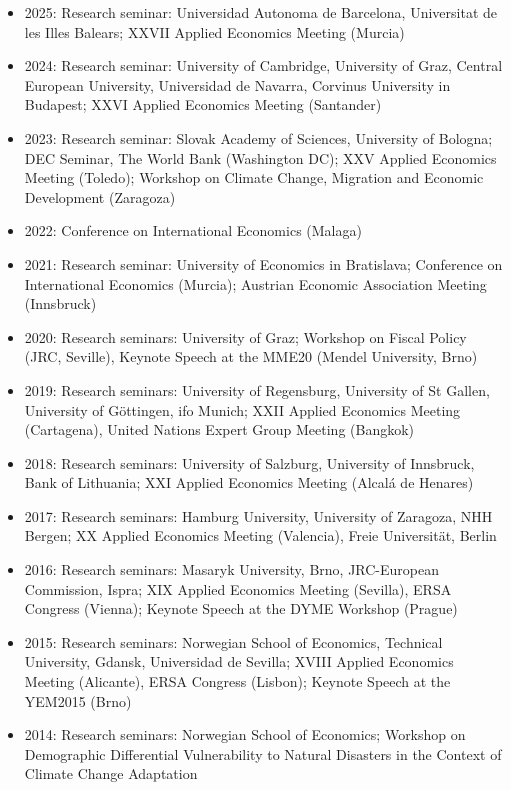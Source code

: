 \documentclass[10pt]{res} %
\begin{document}
\begin{resume}
\begin{itemize}
\item 2025: Research seminar: Universidad Autonoma de Barcelona, Universitat de les Illes Balears; XXVII Applied Economics Meeting (Murcia)
	\item 2024: Research seminar: University of Cambridge, University of Graz, Central European University, Universidad de Navarra, Corvinus University in Budapest; XXVI Applied Economics Meeting (Santander)
	\item 2023: Research seminar: Slovak Academy of Sciences, University of Bologna; DEC Seminar, The World Bank (Washington DC); XXV Applied Economics Meeting (Toledo); Workshop on Climate Change, Migration and Economic Development (Zaragoza)
	\item 2022: Conference on International Economics (Malaga)
	\item 2021: Research seminar: University of Economics in Bratislava; Conference on International Economics (Murcia); Austrian Economic Association Meeting (Innsbruck)
\item 2020: Research seminars: University of Graz; Workshop on Fiscal Policy (JRC, Seville), Keynote Speech at the MME20 (Mendel University, Brno)
\item 2019: Research seminars: University of Regensburg, University of St Gallen,  University of G\"ottingen, ifo Munich;  XXII Applied Economics Meeting (Cartagena), United Nations Expert Group Meeting (Bangkok)
\item 2018: Research seminars:  University of Salzburg,  University of Innsbruck, Bank of Lithuania; XXI Applied Economics Meeting (Alcal\'a de Henares)
\item 2017: Research seminars: Hamburg University, University of Zaragoza, NHH Bergen;
XX Applied Economics Meeting (Valencia), Freie Universit\"at, Berlin
\item 2016: Research seminars: Masaryk University, Brno, JRC-European Commission, Ispra;
XIX Applied Economics Meeting (Sevilla), ERSA Congress (Vienna); Keynote
Speech at the DYME Workshop (Prague)
\item 2015: Research seminars: Norwegian School of Economics, Technical University, Gdansk,
Universidad de Sevilla; XVIII Applied Economics Meeting (Alicante), ERSA Congress
(Lisbon); Keynote Speech at the YEM2015 (Brno)
\item 2014: Research seminars: Norwegian School of Economics; Workshop on Demographic
Differential Vulnerability to Natural Disasters in the Context of Climate Change Adaptation

\end{itemize}
\end{resume}
\end{document}
